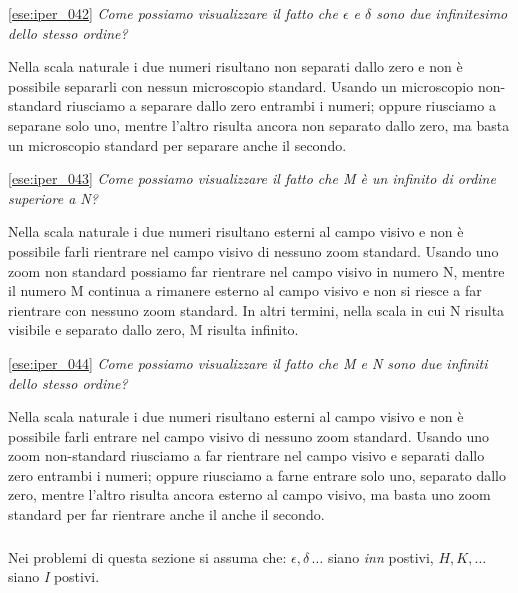 \ref{ese:iper_042} 
\emph{Come possiamo visualizzare il fatto che \(\epsilon\) e \(\delta\) sono 
due infinitesimo dello stesso ordine?}

Nella scala naturale i due numeri risultano non separati dallo zero e non è 
possibile separarli con nessun microscopio standard. Usando un microscopio 
non-standard riusciamo a separare dallo zero entrambi i numeri; oppure 
riusciamo a separane solo uno, mentre l'altro risulta ancora non separato dallo 
zero, ma basta un microscopio standard per separare anche il secondo.

\ref{ese:iper_043} 
\emph{Come possiamo visualizzare il fatto che M è un infinito di ordine 
superiore a N?}

Nella scala naturale i due numeri risultano esterni al campo visivo e non è 
possibile farli rientrare nel campo visivo di nessuno zoom standard. Usando uno 
zoom non standard possiamo far rientrare nel campo visivo in numero N, mentre 
il numero M continua a rimanere esterno al campo visivo e non si riesce a far 
rientrare con nessuno zoom standard. In altri termini, nella scala in cui N 
risulta visibile e separato dallo zero, M risulta infinito.

\ref{ese:iper_044} 
\emph{Come possiamo visualizzare il fatto che M e N sono due infiniti dello 
stesso ordine?}

Nella scala naturale i due numeri risultano esterni al campo visivo e non è 
possibile farli entrare nel campo visivo di nessuno zoom standard. Usando uno 
zoom non-standard riusciamo a far rientrare nel campo visivo e separati dallo 
zero entrambi i numeri; oppure riusciamo a farne entrare solo uno, separato 
dallo zero, mentre l'altro risulta ancora esterno al campo visivo, ma basta uno 
zoom standard per far rientrare anche il anche il secondo.

\subsubsection*{}

Nei problemi di questa sezione si assuma che: 
\(\epsilon, \delta\, \dots\) siano \emph{inn} postivi, 
\(H, K, \dots\) siano \emph{I} postivi.

